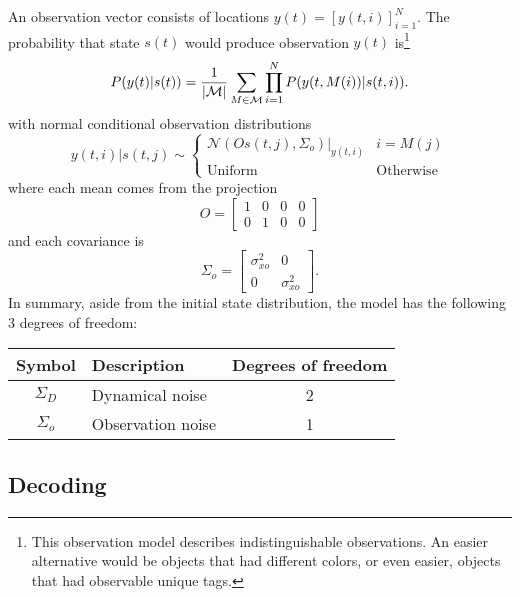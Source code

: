 \documentclass[12pt]{article}
\newcommand{\NormalE}[3]{{\mathcal{N}}\left.\left(#1,#2\right)\right|_{#3}}
\newcommand{\M}{{\cal M}}
\newcommand{\os}[4]{{\left[ #1(#2) \right]}_{#3}^{#4}} %
\newcommand{\ti}[2]{{#1}{(#2)}}                         %
\begin{document}
An observation vector consists of locations
$\ti{y}{t}=\os{y}{t,i}{i=1}{N}$.  The probability that state
$\ti{s}{t}$ would produce observation $\ti{y}{t}$ is\footnote{This
  observation model describes indistinguishable observations.  An
  easier alternative would be objects that had different colors, or
  even easier, objects that had observable unique tags.}
\begin{equation}
  \label{eq:ob}
  P(\ti{y}{t}|\ti{s}{t}) =
    \frac{1}{\left|\M \right|} \sum_{M \in \M}
    \prod_{i=1}^{N} P(\ti{y}{t,M(i)}|\ti{s}{t,i}).
\end{equation}
with normal conditional observation distributions
\begin{equation*}
  \ti{y}{t,i}|\ti{s}{t,j} \sim
  \begin{cases}
    \NormalE{O\ti{s}{t,j}}{\Sigma_o}{\ti{y}{t,i}} & i = M(j) \\
    \text{Uniform} & \text{Otherwise}
  \end{cases}
\end{equation*}
where each mean comes from the projection
\begin{equation*}
  O = \begin{bmatrix} 1 & 0 & 0 & 0\\
    0 & 1 & 0 & 0 \end{bmatrix}
\end{equation*}
and each covariance is
\begin{equation*}
  \Sigma_o = \begin{bmatrix} \sigma_{xo}^2 & 0 \\ 0 &
    \sigma_{xo}^2 \end{bmatrix}.
\end{equation*}
In summary, aside from the initial state distribution, the model has
the following 3 degrees of freedom:
\begin{center}
  \begin{tabular}{|cp{15em}c|}
    \hline
    Symbol & Description & Degrees of freedom \\
    \hline
    $\Sigma_D$ & Dynamical noise & 2 \\
    $\Sigma_o$ & Observation noise & 1 \\
    \hline
  \end{tabular} 
\end{center}

\subsection{Decoding}
\label{sec:decode1}
\end{document}
